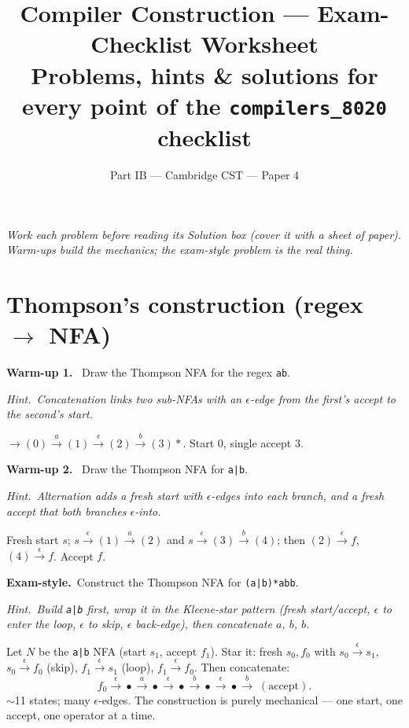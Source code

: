 \documentclass[11pt,a4paper]{article}
\title{\vspace{-1.5cm}\textbf{Compiler Construction --- Exam-Checklist Worksheet}\\[2pt]
\large Problems, hints \& solutions for every point of the \texttt{compilers\_8020} checklist}
\author{\small Part IB --- Cambridge CST --- Paper 4}
\date{}
\newcommand{\hint}[1]{\par{\small\textcolor{accent}{\textit{Hint.}}\ \textit{#1}}\par\smallskip}
\newcommand{\warm}[1]{\smallskip\textbf{\textcolor{hi}{Warm-up #1.}}\ }
\newcommand{\exam}{\smallskip\textbf{\textcolor{warn}{Exam-style.}}\ }
\begin{document}
\maketitle
\vspace{-0.8cm}
\textit{Work each problem before reading its Solution box (cover it with a sheet of paper). Warm-ups build the mechanics; the exam-style problem is the real thing.}

\hrulefill

\section{Thompson's construction (regex $\to$ NFA)}

\warm{1} Draw the Thompson NFA for the regex \texttt{ab}.
\hint{Concatenation links two sub-NFAs with an $\epsilon$-edge from the first's accept to the second's start.}
\begin{sol}
$\to(0)\xrightarrow{a}(1)\xrightarrow{\epsilon}(2)\xrightarrow{b}(3)\!\!*$. Start $0$, single accept $3$.
\end{sol}

\warm{2} Draw the Thompson NFA for \texttt{a|b}.
\hint{Alternation adds a fresh start with $\epsilon$-edges into each branch, and a fresh accept that both branches $\epsilon$-into.}
\begin{sol}
Fresh start $s$; $s\xrightarrow{\epsilon}(1)\xrightarrow{a}(2)$ and $s\xrightarrow{\epsilon}(3)\xrightarrow{b}(4)$; then $(2)\xrightarrow{\epsilon}f$, $(4)\xrightarrow{\epsilon}f$. Accept $f$.
\end{sol}

\exam Construct the Thompson NFA for \texttt{(a|b)*abb}.
\hint{Build \texttt{a|b} first, wrap it in the Kleene-star pattern (fresh start/accept, $\epsilon$ to enter the loop, $\epsilon$ to skip, $\epsilon$ back-edge), then concatenate $a$, $b$, $b$.}
\begin{sol}
Let $N$ be the \texttt{a|b} NFA (start $s_1$, accept $f_1$). Star it: fresh $s_0,f_0$ with
$s_0\xrightarrow{\epsilon}s_1$, $s_0\xrightarrow{\epsilon}f_0$ (skip), $f_1\xrightarrow{\epsilon}s_1$ (loop), $f_1\xrightarrow{\epsilon}f_0$. Then concatenate:
\[
f_0\xrightarrow{\epsilon}\bullet\xrightarrow{a}\bullet\xrightarrow{\epsilon}\bullet\xrightarrow{b}\bullet\xrightarrow{\epsilon}\bullet\xrightarrow{b}\;(\text{accept}).
\]
$\sim$11 states; many $\epsilon$-edges. The construction is purely mechanical --- one start, one accept, one operator at a time.
\end{sol}
\end{document}
